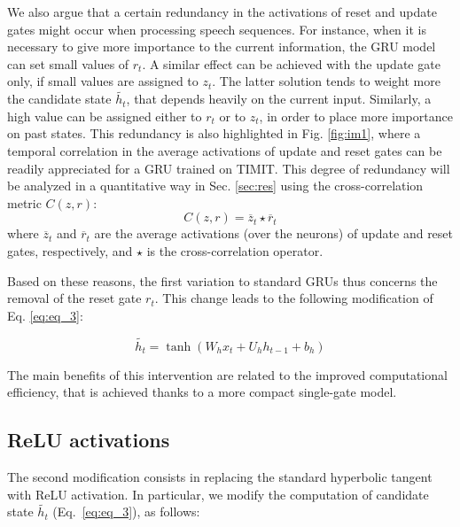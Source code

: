 \documentclass[journal]{IEEEtran}
\begin{document}
We also argue that a certain redundancy in the activations of reset and update gates might occur when processing speech sequences.  For instance, when it is necessary to give more importance to the current information,  the GRU model can set small values of $r_{t}$. A similar effect can be achieved with the update gate only, if small values are assigned to $z_{t}$. The latter solution tends to weight more the candidate state $\widetilde{h_{t}}$, that depends heavily on the current input. 
Similarly, 
a high value can be assigned either to $r_{t}$ or to $z_{t}$, in order to place more importance on past states. 
This redundancy is also highlighted in Fig. \ref{fig:im1}, where a temporal correlation in the average activations of update and reset gates 
can be readily appreciated for a GRU trained on TIMIT. %
This degree of redundancy will be analyzed in a quantitative way in Sec. \ref{sec:res} using the cross-correlation metric $C(z,r)$:
\begin{equation}
C(z,r)=\overline{z}_t \star \overline{r}_t
\label{eq:cross}
\end{equation}
where $\overline{z}_t$ and $\overline{r}_t$ are the average activations (over the neurons) of update and reset gates, respectively, and $\star$ is the cross-correlation operator.

Based on these reasons, the first variation to standard GRUs thus concerns the removal of the reset gate $r_{t}$. %
This change leads to the following modification of Eq. \ref{eq:eq_3}:

\begin{equation}
\widetilde{h_{t}}=\tanh(W_{h}x_{t}+U_{h} h_{t-1}+b_{h})
\end{equation}

The main benefits of this intervention are related to the improved computational efficiency, that is achieved thanks to a more compact single-gate model.


\subsection{ReLU activations}
The second modification consists in replacing the standard hyperbolic tangent with ReLU activation. In particular, we modify the computation of candidate state $\widetilde{h_{t}}$ (Eq.~\ref{eq:eq_3}), as follows:
\end{document}
